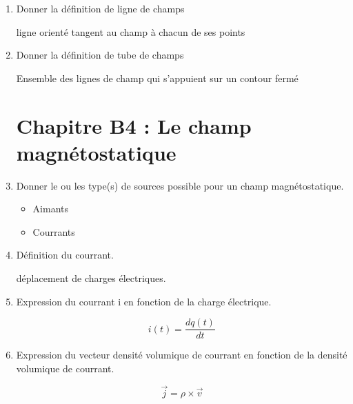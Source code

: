 \documentclass{article}
\begin{document}
\begin{enumerate}[label=\arabic{enumi} - , left=0pt, itemsep=1em]
     \item Donner la définition de ligne de champs \par
     \begin{solution}
      ligne orienté tangent au champ à chacun de ses points
     \end{solution}

     \item Donner la définition de tube de champs \par
     \begin{solution}
      Ensemble des lignes de champ qui s'appuient sur un contour fermé 
     \end{solution}

\section*{\centering Chapitre B4 : Le champ magnétostatique}
    \item Donner le ou les type(s) de sources possible pour un champ magnétostatique. \par
    \begin{solution}
        \begin{itemize}
            \item Aimants
            \item Courrants
        \end{itemize}
    \end{solution}

    \item Définition du courrant.\par
    \begin{solution}
        déplacement de charges électriques.
    \end{solution}

    \item Expression du courrant i en fonction de la charge électrique.\par
    \begin{solution}
        \[ i(t) = \frac{dq(t)}{dt} \]
    \end{solution}


    \item Expression du vecteur densité volumique de courrant en fonction de la densité volumique de courrant.\par
    \begin{solution}
        \[ \vec{j} = \rho \times \vec{v} \]
    \end{solution}


\end{enumerate}
\end{document}
